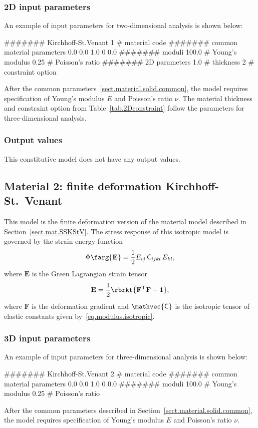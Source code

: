 \subsubsection{2D input parameters}
An example of input parameters for two-dimensional analysis is shown 
below:
\begin{inputfile}
####### Kirchhoff-St.Venant
1     # material code
####### common material parameters
0.0    0.0    1.0
0      0.0
####### moduli
100.0 # Young's modulus
0.25  # Poisson's ratio
####### 2D parameters
1.0   # thickness
2     # constraint option
\end{inputfile}
After the common parameters~\ref{sect.material.solid.common}, the 
model requires specification of Young's modulus $E$ and Poisson's 
ratio $\nu$. The material thickness and 
constraint option from Table~\ref{tab.2Dconstraint} 
follow the 
parameters for three-dimensional analysis.

\subsubsection{Output values}
This constitutive model does not have any output values.

\subsection{Material 2: finite deformation Kirchhoff-St.~Venant}
\label{sect.mat.FDKStV}
This model is the finite deformation version of the material model
described in Section~\ref{sect.mat.SSKStV}.
The stress response of this isotropic model is 
governed by the strain energy function
\begin{equation}
\Phi\farg{\mathbf{E}}=
\frac{1}{2} E_{ij}\,\mathsf{C}_{ijkl}\,E_{kl},
\end{equation}
where $\mathbf{E}$ is the Green Lagrangian strain tensor
\begin{equation}
	\mathbf{E} = \frac{1}{2}\rbrkt{
	\mathbf{F}^{\text{T}}\mathbf{F} - \mathbf{1}},
\end{equation}
where $\mathbf{F}$ is the deformation gradient
and $\mathvec{\mathsf{C}}$ is the isotropic tensor of 
elastic constants given by~\eqref{eq.modulus.isotropic}.

\subsubsection{3D input parameters}
An example of input parameters for three-dimensional analysis is shown 
below:
\begin{inputfile}
####### Kirchhoff-St.Venant
2     # material code
####### common material parameters
0.0    0.0    1.0
0      0.0
####### moduli
100.0 # Young's modulus
0.25  # Poisson's ratio
\end{inputfile}
After the common parameters described in 
Section~\ref{sect.material.solid.common}, the 
model requires specification of Young's modulus 
$E$ and Poisson's ratio $\nu$.

